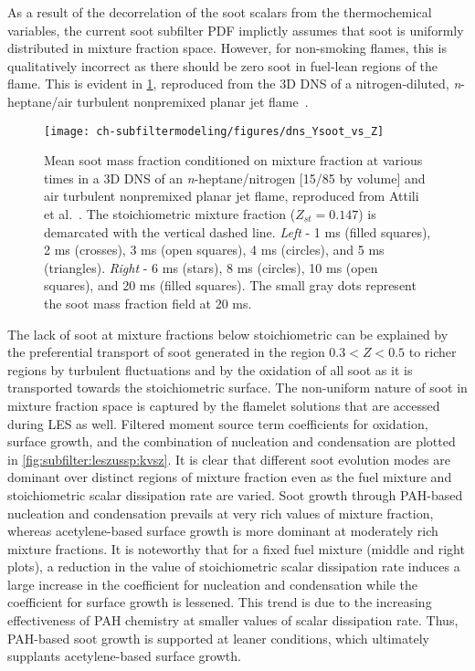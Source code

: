 As a result of the decorrelation of the soot scalars from the thermochemical variables, the current soot subfilter PDF implictly assumes that soot is uniformly distributed in mixture fraction space. However, for non-smoking flames, this is qualitatively incorrect as there should be zero soot in fuel-lean regions of the flame. This is evident in \cref{fig:subfilter:leszussp:ysvsz}, reproduced from the 3D DNS of a nitrogen-diluted, \textit{n}-heptane/air turbulent nonpremixed planar jet flame~\cite{attili2014}.

\begin{figure}[htb]
  \begin{center}
    \texttt{[image: ch-subfiltermodeling/figures/dns\_Ysoot\_vs\_Z]}
    \caption[DNS of Turbulent Nonpremixed / Jet Flame, \texorpdfstring{$\langle Y_{\text{s}}|Z \rangle$}{<Ys|Z>} vs. \texorpdfstring{$Z$}{Z}]{Mean soot mass fraction conditioned on mixture fraction at various times in a 3D DNS of an \textit{n}-heptane/nitrogen [15/85 by volume] and air turbulent nonpremixed planar jet flame, reproduced from Attili et al.~\cite{attili2014}. The stoichiometric mixture fraction ($Z_{st} = 0.147$) is demarcated with the vertical dashed line. \textit{Left} - 1 ms (filled squares), 2 ms (crosses), 3 ms (open squares), 4 ms (circles), and 5 ms (triangles). \textit{Right} - 6 ms (stars), 8 ms (circles), 10 ms (open squares), and 20 ms (filled squares). The small gray dots represent the soot mass fraction field at 20 ms.}
    \label{fig:subfilter:leszussp:ysvsz}
  \end{center}
\end{figure}

The lack of soot at mixture fractions below stoichiometric can be explained by the preferential transport of soot generated in the region $0.3 < Z < 0.5$ to richer regions by turbulent fluctuations and by the oxidation of all soot as it is transported towards the stoichiometric surface. The non-uniform nature of soot in mixture fraction space is captured by the flamelet solutions that are accessed during LES as well. Filtered moment source term coefficients for oxidation, surface growth, and the combination of nucleation and condensation are plotted in \cref{fig:subfilter:leszussp:kvsz}. It is clear that different soot evolution modes are dominant over distinct regions of mixture fraction even as the fuel mixture and stoichiometric scalar dissipation rate are varied. Soot growth through PAH-based nucleation and condensation prevails at very rich values of mixture fraction, whereas acetylene-based surface growth is more dominant at moderately rich mixture fractions. It is noteworthy that for a fixed fuel mixture (middle and right plots), a reduction in the value of stoichiometric scalar dissipation rate induces a large increase in the coefficient for nucleation and condensation while the coefficient for surface growth is lessened. This trend is due to the increasing effectiveness of PAH chemistry at smaller values of scalar dissipation rate. Thus, PAH-based soot growth is supported at leaner conditions, which ultimately supplants acetylene-based surface growth.

